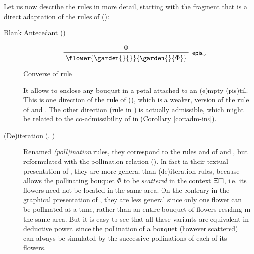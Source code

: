 Let us now describe the rules in more detail, starting with the fragment that is
a direct adaptation of the rules of  ():

\begin{description}
  \item[Blank Antecedant ()]
    
    \begin{marginfigure}
      $$
      \R[\rsf{epis{\da}}]
        {\Phi}
        {\flower{\garden{{}}{{}}}{\garden{{}}{\Phi}}}
      $$
      \caption{Converse of  rule}
    \end{marginfigure}

    It allows to enclose any bouquet in a petal attached to an \textsf{(e)}mpty
    \textsf{(pis)}til. This is one direction of the rule  of
    (), which is a weaker,  version
    of the  rule  of  and . The
    other direction (rule  in ) is
    actually admissible, which might be related to the co-admissibility of
     in  (Corollary \ref{cor:adm-ins}).

  \item[(De)iteration (, )]
    Renamed \emph{\textsf{(poll)}ination} rules, they correspond to the rules
     and  of  and , but reformulated
    with the pollination relation (). In fact in their
    textual presentation of , they are more general than
    (de)iteration rules, because  allows the pollinating
    bouquet $\Phi$ to be \emph{scattered} in the context $\Xi\square$, i.e. its
    flowers need not be located in the same area. On the contrary in the
    graphical presentation of , they are less general
    since only one flower can be pollinated at a time, rather than an entire
    bouquet of flowers residing in the same area. But it is easy to see that all
    these variants are equivalent in deductive power, since the pollination of a
    bouquet (however scattered) can always be simulated by the successive
    pollinations of each of its flowers.


\end{description}

